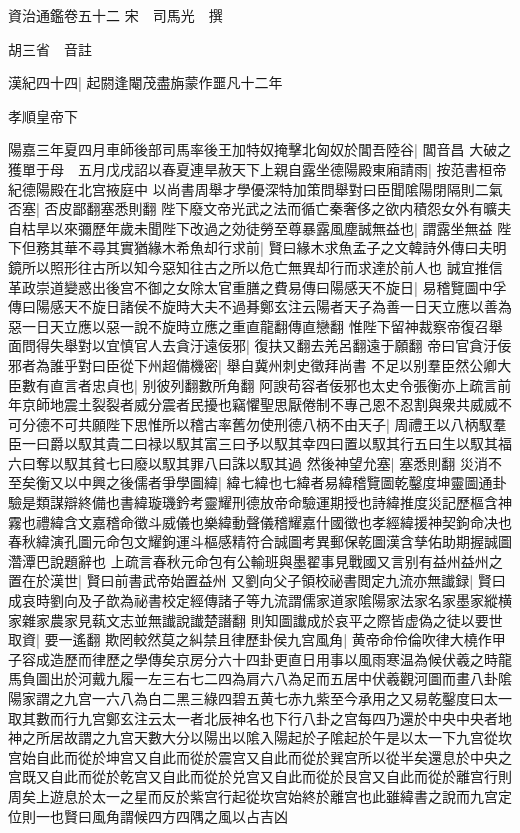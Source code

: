 資治通鑑卷五十二
宋　司馬光　撰

胡三省　音註

漢紀四十四|{
	起閼逢閹茂盡旃蒙作噩凡十二年}


孝順皇帝下

陽嘉三年夏四月車師後部司馬率後王加特奴掩擊北匈奴於閶吾陸谷|{
	閶音昌}
大破之獲單于母　五月戊戌詔以春夏連旱赦天下上親自露坐德陽殿東廂請雨|{
	按范書桓帝紀德陽殿在北宫掖庭中}
以尚書周舉才學優深特加策問舉對曰臣聞隂陽閉隔則二氣否塞|{
	否皮鄙翻塞悉則翻}
陛下廢文帝光武之法而循亡秦奢侈之欲内積怨女外有曠夫自枯旱以來彌歷年歲未聞陛下改過之効徒勞至尊暴露風塵誠無益也|{
	謂露坐無益}
陛下但務其華不尋其實猶緣木希魚却行求前|{
	賢曰緣木求魚孟子之文韓詩外傳曰夫明鏡所以照形往古所以知今惡知往古之所以危亡無異却行而求達於前人也}
誠宜推信革政崇道變惑出後宫不御之女除太官重膳之費易傳曰陽感天不旋日|{
	易稽覽圖中孚傳曰陽感天不旋日諸侯不旋時大夫不過朞鄭玄注云陽者天子為善一日天立應以善為惡一日天立應以惡一說不旋時立應之重直龍翻傳直戀翻}
惟陛下留神裁察帝復召舉面問得失舉對以宜慎官人去貪汙遠佞邪|{
	復扶又翻去羌呂翻遠于願翻}
帝曰官貪汙佞邪者為誰乎對曰臣從下州超備機密|{
	舉自冀州刺史徵拜尚書}
不足以别羣臣然公卿大臣數有直言者忠貞也|{
	别彼列翻數所角翻}
阿諛苟容者佞邪也太史令張衡亦上疏言前年京師地震土裂裂者威分震者民擾也竊懼聖思厭倦制不專己恩不忍割與衆共威威不可分德不可共願陛下思惟所以稽古率舊勿使刑德八柄不由天子|{
	周禮王以八柄馭羣臣一曰爵以馭其貴二曰禄以馭其富三曰予以馭其幸四曰置以馭其行五曰生以馭其福六曰奪以馭其貧七曰廢以馭其罪八曰誅以馭其過}
然後神望允塞|{
	塞悉則翻}
災消不至矣衡又以中興之後儒者爭學圖緯|{
	緯七緯也七緯者易緯稽覽圖乾鑿度坤靈圖通卦驗是類謀辯終備也書緯璇璣鈐考靈耀刑德放帝命驗運期授也詩緯推度災記歷樞含神霧也禮緯含文嘉稽命徵斗威儀也樂緯動聲儀稽耀嘉什國徵也孝經緯援神契鉤命决也春秋緯演孔圖元命包文耀鉤運斗樞感精符合誠圖考異郵保乾圖漢含孳佑助期握誠圖濳潭巴說題辭也}
上疏言春秋元命包有公輸班與墨翟事見戰國又言别有益州益州之置在於漢世|{
	賢曰前書武帝始置益州}
又劉向父子領校祕書閲定九流亦無䜟録|{
	賢曰成哀時劉向及子歆為祕書校定經傳諸子等九流謂儒家道家隂陽家法家名家墨家縱横家雜家農家見蓻文志並無䜟說䜟楚譖翻}
則知圖䜟成於哀平之際皆虚偽之徒以要世取資|{
	要一遙翻}
欺罔較然莫之糾禁且律歷卦侯九宫風角|{
	黄帝命伶倫吹律大橈作甲子容成造歷而律歷之學傳矣京房分六十四卦更直日用事以風雨寒温為候伏羲之時龍馬負圖出於河戴九履一左三右七二四為肩六八為足而五居中伏羲觀河圖而畫八卦隂陽家謂之九宫一六八為白二黑三綠四碧五黄七赤九紫至今承用之又易乾鑿度曰太一取其數而行九宫鄭玄注云太一者北辰神名也下行八卦之宫每四乃還於中央中央者地神之所居故謂之九宫天數大分以陽出以隂入陽起於子隂起於午是以太一下九宫從坎宫始自此而從於坤宫又自此而從於震宫又自此而從於巽宫所以從半矣還息於中央之宫既又自此而從於乾宫又自此而從於兑宫又自此而從於艮宫又自此而從於離宫行則周矣上遊息於太一之星而反於紫宫行起從坎宫始終於離宫也此雖緯書之說而九宫定位則一也賢曰風角謂候四方四隅之風以占吉凶}
